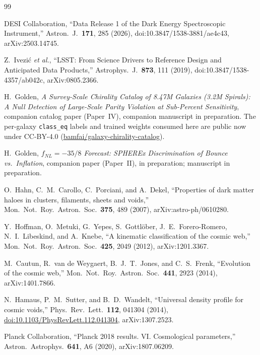 \documentclass[aps,prd,twocolumn,superscriptaddress,showpacs,preprintnumbers,nofootinbib,longbibliography,floatfix]{revtex4-2}
\newcommand{\paperIVarxiv}{companion manuscript in preparation}
\begin{document}
\begin{thebibliography}{99}

DESI Collaboration, ``Data Release 1 of the Dark Energy Spectroscopic
Instrument,'' Astron.\ J.\ \textbf{171}, 285 (2026),
doi:10.3847/1538-3881/ae4c43, arXiv:2503.14745.

Z.~Ivezi\'c \textit{et al.}, ``LSST: From Science Drivers to Reference
Design and Anticipated Data Products,'' Astrophys.\ J.\ \textbf{873},
111 (2019), doi:10.3847/1538-4357/ab042c, arXiv:0805.2366.

H.~Golden,
\emph{A Survey-Scale Chirality Catalog of 8.47M Galaxies (3.2M Spirals):
A Null Detection of Large-Scale Parity Violation at Sub-Percent
Sensitivity}, companion catalog paper (Paper~IV), \paperIVarxiv{}.
The per-galaxy \texttt{class\_eq} labels and trained weights consumed here are
public now under CC-BY-4.0 (\href{https://huggingface.co/datasets/bamfai/galaxy-chirality-catalog}{bamfai/galaxy-chirality-catalog}).

H.~Golden,
\emph{$f_{NL} = -35/8$ Forecast: SPHEREx Discrimination of Bounce vs.\
Inflation}, companion paper (Paper~II), in preparation; manuscript in preparation.

O.~Hahn, C.~M.~Carollo, C.~Porciani, and A.~Dekel,
``Properties of dark matter haloes in clusters, filaments, sheets and
voids,'' Mon.\ Not.\ Roy.\ Astron.\ Soc.\ \textbf{375}, 489 (2007),
arXiv:astro-ph/0610280.

Y.~Hoffman, O.~Metuki, G.~Yepes, S.~Gottl\"ober, J.~E.~Forero-Romero,
N.~I.~Libeskind, and A.~Knebe,
``A kinematic classification of the cosmic web,''
Mon.\ Not.\ Roy.\ Astron.\ Soc.\ \textbf{425}, 2049 (2012),
arXiv:1201.3367.

M.~Cautun, R.~van de Weygaert, B.~J.~T.~Jones, and C.~S.~Frenk,
``Evolution of the cosmic web,''
Mon.\ Not.\ Roy.\ Astron.\ Soc.\ \textbf{441}, 2923 (2014),
arXiv:1401.7866.

N.~Hamaus, P.~M.~Sutter, and B.~D.~Wandelt,
``Universal density profile for cosmic voids,''
Phys.\ Rev.\ Lett.\ \textbf{112}, 041304 (2014),
\href{https://doi.org/10.1103/PhysRevLett.112.041304}{doi:10.1103/PhysRevLett.112.041304},
arXiv:1307.2523.

Planck Collaboration,
``Planck 2018 results. VI. Cosmological parameters,''
Astron.\ Astrophys.\ \textbf{641}, A6 (2020),
arXiv:1807.06209.


\end{thebibliography}
\end{document}
